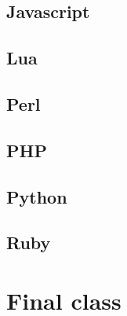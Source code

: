 \documentclass{KodeBook}
\begin{document}

\subsection{Javascript} 


\subsection{Lua}


\subsection{Perl}


\subsection{PHP}


\subsection{Python}


\subsection{Ruby}



\section{Final class}
\end{document}
